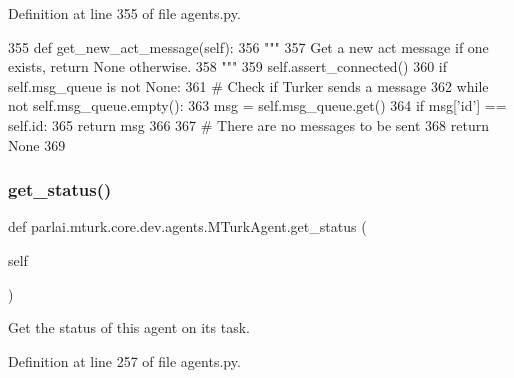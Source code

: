 Definition at line 355 of file agents.\+py.


\begin{DoxyCode}
355     \textcolor{keyword}{def }get\_new\_act\_message(self):
356         \textcolor{stringliteral}{"""}
357 \textcolor{stringliteral}{        Get a new act message if one exists, return None otherwise.}
358 \textcolor{stringliteral}{        """}
359         self.assert\_connected()
360         \textcolor{keywordflow}{if} self.msg\_queue \textcolor{keywordflow}{is} \textcolor{keywordflow}{not} \textcolor{keywordtype}{None}:
361             \textcolor{comment}{# Check if Turker sends a message}
362             \textcolor{keywordflow}{while} \textcolor{keywordflow}{not} self.msg\_queue.empty():
363                 msg = self.msg\_queue.get()
364                 \textcolor{keywordflow}{if} msg[\textcolor{stringliteral}{'id'}] == self.id:
365                     \textcolor{keywordflow}{return} msg
366 
367         \textcolor{comment}{# There are no messages to be sent}
368         \textcolor{keywordflow}{return} \textcolor{keywordtype}{None}
369 
\end{DoxyCode}
\mbox{\label{classparlai_1_1mturk_1_1core_1_1dev_1_1agents_1_1MTurkAgent_a2423bb27d86be375313b61a60a12be0d}} 
\subsubsection{\texorpdfstring{get\+\_\+status()}{get\_status()}}
{\footnotesize\ttfamily def parlai.\+mturk.\+core.\+dev.\+agents.\+M\+Turk\+Agent.\+get\+\_\+status (\begin{DoxyParamCaption}\item[{}]{self }\end{DoxyParamCaption})}

\begin{DoxyVerb}Get the status of this agent on its task.
\end{DoxyVerb}
 

Definition at line 257 of file agents.\+py.


